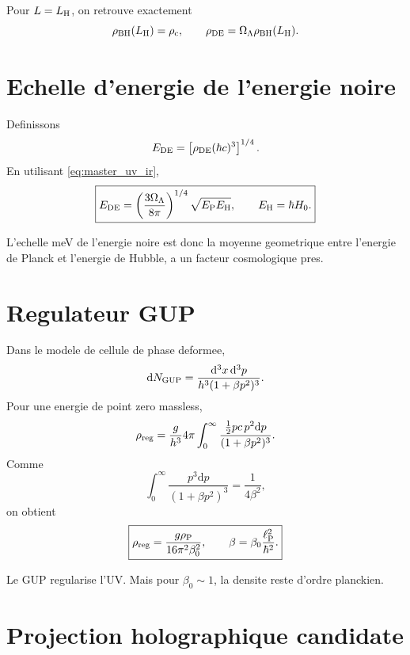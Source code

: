 \documentclass[11pt,a4paper]{article}
\newcommand{\dd}{\mathrm{d}}
\newcommand{\lp}{\ell_{\rm P}}
\newcommand{\rhoP}{\rho_{\rm P}}
\newcommand{\rhoDE}{\rho_{\rm DE}}
\newcommand{\rhoC}{\rho_{\rm c}}
\newcommand{\LH}{L_{\rm H}}
\newcommand{\EP}{E_{\rm P}}
\newcommand{\EH}{E_{\rm H}}
\newcommand{\rhoreg}{\rho_{\rm reg}}
\newcommand{\rhobh}{\rho_{\rm BH}}
\begin{document}
Pour $L=\LH$, on retrouve exactement
\begin{equation}
\rhobh(\LH)=\rhoC,
\qquad
\rhoDE=\Omega_\Lambda\rhobh(\LH).
\end{equation}

\section{Echelle d'energie de l'energie noire}

Definissons
\begin{equation}
E_{\rm DE}=\left[\rhoDE(\hbar c)^3\right]^{1/4}.
\end{equation}
En utilisant \eqref{eq:master_uv_ir},
\begin{equation}
\boxed{
E_{\rm DE}
=
\left(\frac{3\Omega_\Lambda}{8\pi}\right)^{1/4}
\sqrt{\EP\EH},
\qquad
\EH=\hbar H_0.
}
\label{eq:E_de}
\end{equation}

L'echelle meV de l'energie noire est donc la moyenne geometrique entre
l'energie de Planck et l'energie de Hubble, a un facteur cosmologique pres.

\section{Regulateur GUP}

Dans le modele de cellule de phase deformee,
\begin{equation}
\dd N_{\rm GUP}
=
\frac{\dd^3x\,\dd^3p}{h^3(1+\beta p^2)^3}.
\end{equation}
Pour une energie de point zero massless,
\begin{equation}
\rhoreg
=
\frac{g}{h^3}4\pi\int_0^\infty
\frac{\frac12 pc\,p^2\dd p}{(1+\beta p^2)^3}.
\end{equation}
Comme
\begin{equation}
\int_0^\infty\frac{p^3\dd p}{(1+\beta p^2)^3}
=\frac{1}{4\beta^2},
\end{equation}
on obtient
\begin{equation}
\boxed{
\rhoreg
=
\frac{g\rhoP}{16\pi^2\beta_0^2},
\qquad
\beta=\beta_0\frac{\lp^2}{\hbar^2}.
}
\label{eq:rho_reg}
\end{equation}

Le GUP regularise l'UV. Mais pour $\beta_0\sim1$, la densite reste d'ordre
planckien.

\section{Projection holographique candidate}
\end{document}
